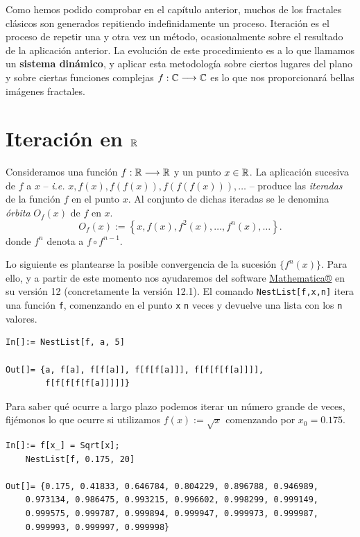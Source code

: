 
Como hemos podido comprobar en el capítulo anterior, muchos de los fractales clásicos son generados repitiendo indefinidamente un proceso. Iteración es el proceso de repetir una y otra vez un método, ocasionalmente sobre el resultado de la aplicación anterior. La evolución de este procedimiento es a lo que llamamos un \textbf{sistema dinámico}, y aplicar esta metodología sobre ciertos lugares del plano y sobre ciertas funciones complejas $f:\mathbb{C}\longrightarrow\mathbb{C}$ es lo que nos proporcionará bellas imágenes fractales.

\section{Iteración en $\mathbb{R}$}
\begin{definicion}
    Consideramos una función $f:\mathbb{R}\longrightarrow\mathbb{R}$ y un punto $x\in\mathbb{R}$. La aplicación sucesiva de $f$ a $x$ -- \textit{i.e.} $x,f(x),f(f(x)), f(f(f(x))),\dots$ -- produce las \textit{iteradas} de la función $f$ en el punto $x$. Al conjunto de dichas iteradas se le denomina \textit{órbita} $O_f(x)$ de $f$ en $x$.
    $$
    O_f(x):=\left\lbrace x, f(x), f^2(x), \dots, f^n(x), \dots\right\rbrace.
    $$
    donde $f^n$ denota a $f\circ f^{n-1}$.
\end{definicion}

Lo siguiente es plantearse la posible convergencia de la sucesión $\{f^n(x)\}$. Para ello, y a partir de este momento nos ayudaremos del software \textcolor{blue}{\href{https://www.wolfram.com/mathematica/}{Mathematica®}} en su versión 12 (concretamente la versión 12.1). El comando \verb|NestList[f,x,n]| itera una función \verb|f|, comenzando en el punto \verb|x| \verb|n| veces y devuelve una lista con los \verb|n| valores. 

\begin{verbatim}
In[]:= NestList[f, a, 5]

Out[]= {a, f[a], f[f[a]], f[f[f[a]]], f[f[f[f[a]]]], 
        f[f[f[f[f[a]]]]]}
\end{verbatim}

Para saber qué ocurre a largo plazo podemos iterar un número grande de veces, fijémonos lo que ocurre si utilizamos $f(x):=\sqrt{x}$ comenzando por $x_0=0.175$.

\begin{verbatim}
In[]:= f[x_] = Sqrt[x];
    NestList[f, 0.175, 20]
    
Out[]= {0.175, 0.41833, 0.646784, 0.804229, 0.896788, 0.946989, 
    0.973134, 0.986475, 0.993215, 0.996602, 0.998299, 0.999149, 
    0.999575, 0.999787, 0.999894, 0.999947, 0.999973, 0.999987, 
    0.999993, 0.999997, 0.999998}
\end{verbatim}

